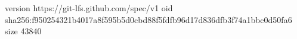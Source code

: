version https://git-lfs.github.com/spec/v1
oid sha256:f950254321b4017a8f595b5d0cbd88f5fdfb96d17d836dfb3f74a1bbc0d50fa6
size 43840
